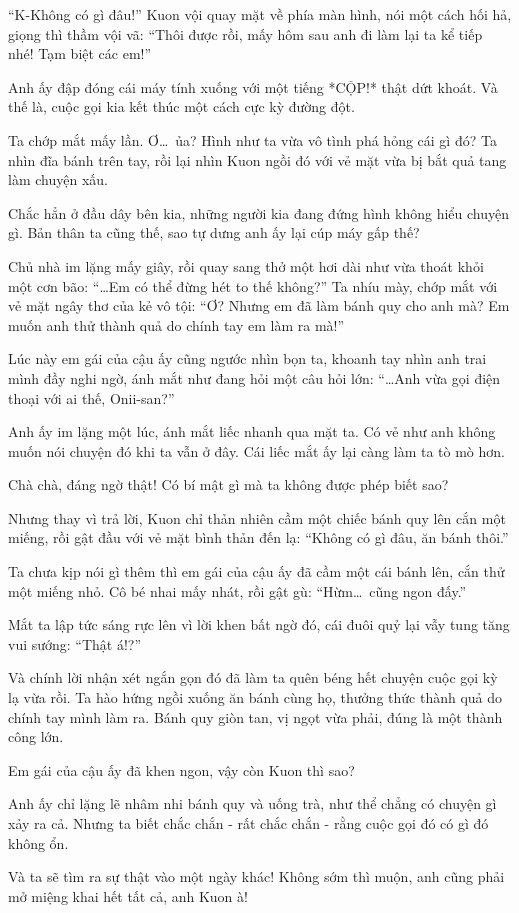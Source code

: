 \documentclass[../main.tex]{subfiles}
\begin{document}
``K-Không có gì đâu!'' Kuon vội quay mặt về phía màn hình, nói một cách hối hả, giọng thì thầm vội vã: ``Thôi được rồi, mấy hôm sau anh đi làm lại ta kể tiếp nhé! Tạm biệt các em!''

Anh ấy đập đóng cái máy tính xuống với một tiếng *CỘP!* thật dứt khoát. Và thế là, cuộc gọi kia kết thúc một cách cực kỳ đường đột.

Ta chớp mắt mấy lần. Ơ\dots\ ủa? Hình như ta vừa vô tình phá hỏng cái gì đó? Ta nhìn đĩa bánh trên tay, rồi lại nhìn Kuon ngồi đó với vẻ mặt vừa bị bắt quả tang làm chuyện xấu.

Chắc hẳn ở đầu dây bên kia, những người kia đang đứng hình không hiểu chuyện gì. Bản thân ta cũng thế, sao tự dưng anh ấy lại cúp máy gấp thế? 

Chủ nhà im lặng mấy giây, rồi quay sang thở một hơi dài như vừa thoát khỏi một cơn bão: ``\dots Em có thể đừng hét to thế không?'' Ta nhíu mày, chớp mắt với vẻ mặt ngây thơ của kẻ vô tội: ``Ơ? Nhưng em đã làm bánh quy cho anh mà? Em muốn anh thử thành quả do chính tay em làm ra mà!''

Lúc này em gái của cậu ấy cũng ngước nhìn bọn ta, khoanh tay nhìn anh trai mình đầy nghi ngờ, ánh mắt như đang hỏi một câu hỏi lớn: ``\dots Anh vừa gọi điện thoại với ai thế, Onii-san?''

Anh ấy im lặng một lúc, ánh mắt liếc nhanh qua mặt ta. Có vẻ như anh không muốn nói chuyện đó khi ta vẫn ở đây. Cái liếc mắt ấy lại càng làm ta tò mò hơn.

Chà chà, đáng ngờ thật! Có bí mật gì mà ta không được phép biết sao?

Nhưng thay vì trả lời, Kuon chỉ thản nhiên cầm một chiếc bánh quy lên cắn một miếng, rồi gật đầu với vẻ mặt bình thản đến lạ: ``Không có gì đâu, ăn bánh thôi.''

Ta chưa kịp nói gì thêm thì em gái của cậu ấy đã cầm một cái bánh lên, cắn thử một miếng nhỏ. Cô bé nhai mấy nhát, rồi gật gù: ``Hừm\dots\ cũng ngon đấy.''

Mắt ta lập tức sáng rực lên vì lời khen bất ngờ đó, cái đuôi quỷ lại vẫy tung tăng vui sướng: ``Thật á!?''

Và chính lời nhận xét ngắn gọn đó đã làm ta quên béng hết chuyện cuộc gọi kỳ lạ vừa rồi. Ta hào hứng ngồi xuống ăn bánh cùng họ, thưởng thức thành quả do chính tay mình làm ra. Bánh quy giòn tan, vị ngọt vừa phải, đúng là một thành công lớn.

Em gái của cậu ấy đã khen ngon, vậy còn Kuon thì sao?

Anh ấy chỉ lặng lẽ nhâm nhi bánh quy và uống trà, như thể chẳng có chuyện gì xảy ra cả. Nhưng ta biết chắc chắn - rất chắc chắn - rằng cuộc gọi đó có gì đó không ổn.

Và ta sẽ tìm ra sự thật vào một ngày khác! Không sớm thì muộn, anh cũng phải mở miệng khai hết tất cả, anh Kuon à!
\end{document}
